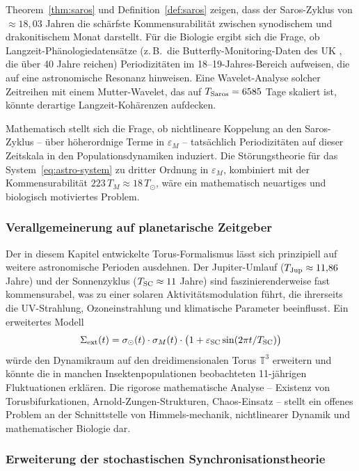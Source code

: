 ﻿\documentclass[12pt, a4paper]{article}
\theoremstyle{definition}
\begin{document}
Theorem~\ref{thm:saros} und Definition~\ref{def:saros} zeigen, dass der
Saros-Zyklus von $\approx 18{,}03$ Jahren die schärfste Kommensurabilität
zwischen synodischem und drakonitischem Monat darstellt. Für die Biologie
ergibt sich die Frage, ob Langzeit-Phänologiedatensätze (z.\,B.\ die
Butterfly-Monitoring-Daten des UK \cite{Visser2005}, die über 40 Jahre reichen)
Periodizitäten im 18--19-Jahres-Bereich aufweisen, die auf eine astronomische
Resonanz hinweisen. Eine Wavelet-Analyse solcher Zeitreihen mit einem
Mutter-Wavelet, das auf $T_{\rm Saros} = 6585$ Tage skaliert ist, könnte
derartige Langzeit-Kohärenzen aufdecken.

Mathematisch stellt sich die Frage, ob nichtlineare Koppelung an den Saros-Zyklus
-- über höherordnige Terme in $\varepsilon_M$ -- tatsächlich Periodizitäten auf
dieser Zeitskala in den Populationsdynamiken induziert. Die Störungstheorie für
das System~\eqref{eq:astro-system} zu dritter Ordnung in $\varepsilon_M$,
kombiniert mit der Kommensurabilität $223\,T_M \approx 18\,T_{\odot}$, wäre
ein mathematisch neuartiges und biologisch motiviertes Problem.

\subsubsection{Verallgemeinerung auf planetarische Zeitgeber}

Der in diesem Kapitel entwickelte Torus-Formalismus lässt sich prinzipiell auf
weitere astronomische Perioden ausdehnen. Der Jupiter-Umlauf ($T_{\rm Jup}
\approx 11{,}86$ Jahre) und der Sonnenzyklus ($T_{\rm SC} \approx 11$ Jahre)
sind faszinierender\-weise fast kommensurabel, was zu einer solaren Aktivitäts\-modulation
führt, die ihrerseits die UV-Strahlung, Ozoneinstrahlung und klimatische Parameter
beeinflusst. Ein erweitertes Modell
\[
  \Sigma_{\rm ext}(t) = \sigma_{\odot}(t)\cdot\sigma_M(t)
  \cdot\bigl(1 + \varepsilon_{\rm SC}\sin(2\pi t / T_{\rm SC})\bigr)
\]
würde den Dynamikraum auf den dreidimensionalen Torus $\mathbb{T}^3$ erweitern
und könnte die in manchen Insektenpopulationen beobachteten 11-jährigen Fluktuationen
erklären. Die rigorose mathematische Analyse -- Existenz von Torusbifurkationen,
Arnold-Zungen-Strukturen, Chaos-Einsatz -- stellt ein offenes Problem an der
Schnittstelle von Himmels-mechanik, nichtlinearer Dynamik und mathematischer
Biologie dar.

\subsubsection{Erweiterung der stochastischen Synchronisationstheorie}
\end{document}
